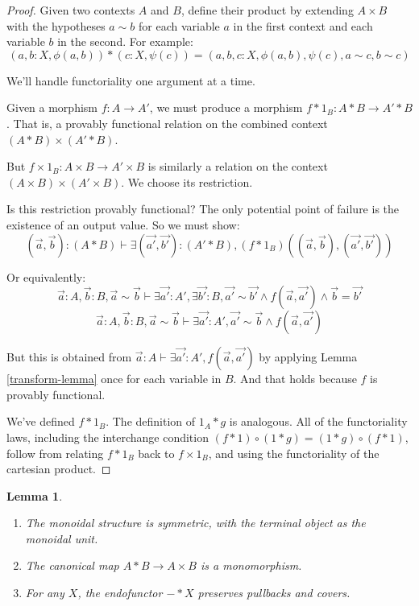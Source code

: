 \documentclass{article}
\newtheorem{lemma}[theorem]{Lemma}
\begin{document}
\begin{proof}
    Given two contexts \(A\) and \(B\), define their product by extending \(A \times B\) with the hypotheses \(a \sim b\) for each variable \(a\) in the first context and each variable \(b\) in the second.
    For example:
    \[(a,b : X, \phi(a,b)) * (c : X, \psi(c)) = (a,b,c : X, \phi(a,b), \psi(c), a \sim c, b \sim c)\]
    
    We'll handle functoriality one argument at a time.

    Given a morphism \(f : A \to A'\), we must produce a morphism \(f*1_B : A*B \to A'*B\).
    That is, a provably functional relation on the combined context \((A*B) \times (A'*B)\).

    But \(f \times 1_B : A \times B \to A' \times B\) is similarly a relation on the context \((A \times B) \times (A' \times B)\).
    We choose its restriction.

    Is this restriction provably functional? The only potential point of failure is the existence of an output value. So we must show:
    \[(\vec{a},\vec{b}) : (A*B) \vdash \exists (\vec{a'},\vec{b'}) : (A'*B), (f*1_B)((\vec{a},\vec{b}), (\vec{a'},\vec{b'}))\]

    Or equivalently:
    \[\vec{a} : A, \vec{b} : B, \vec{a} \sim \vec{b} \vdash \exists \vec{a'} : A', \exists \vec{b'} : B, \vec{a'} \sim \vec{b'} \land f(\vec{a},\vec{a'}) \land \vec{b} = \vec{b'}\]
    \[\vec{a} : A, \vec{b} : B, \vec{a} \sim \vec{b} \vdash \exists \vec{a'} : A', \vec{a'} \sim \vec{b} \land f(\vec{a},\vec{a'})\]

    But this is obtained from \(\vec{a} : A \vdash \exists \vec{a'} : A', f(\vec{a},\vec{a'})\) by applying Lemma \ref{transform-lemma} once for each variable in \(B\).
    And that holds because \(f\) is provably functional.

    \vspace{1em}

    We've defined \(f * 1_B\). The definition of \(1_A * g\) is analogous.
    All of the functoriality laws, including the interchange condition \((f * 1) \circ (1 * g) = (1 * g) \circ (f * 1)\),
    follow from relating \(f * 1_B\) back to \(f \times 1_B\), and using the functoriality of the cartesian product.
\end{proof}

\begin{lemma}\leavevmode
    \begin{enumerate}
        \item The monoidal structure is symmetric, with the terminal object as the monoidal unit.
        \item The canonical map \(A*B \to A \times B\) is a monomorphism.
        \item For any \(X\), the endofunctor \(-*X\) preserves pullbacks and covers.
    \end{enumerate}
\end{lemma}
\end{document}
